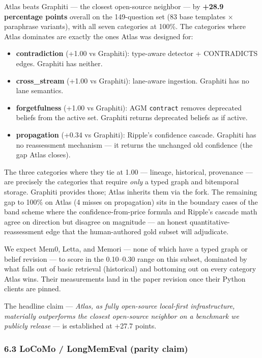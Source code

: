 \documentclass[
  11pt,
]{article}
\newcounter{none} %
\providecommand{\tightlist}{%
  \setlength{\itemsep}{0pt}\setlength{\parskip}{0pt}}
\begin{document}
Atlas beats Graphiti --- the closest open-source neighbor --- by
\textbf{+28.9 percentage points} overall on the 149-question set (83
base templates × paraphrase variants), with all seven categories at
100\%. The categories where Atlas dominates are exactly the ones Atlas
was designed for:

\begin{itemize}
\tightlist
\item
  \textbf{contradiction} (+1.00 vs Graphiti): type-aware detector +
  CONTRADICTS edges. Graphiti has neither.
\item
  \textbf{cross\_stream} (+1.00 vs Graphiti): lane-aware ingestion.
  Graphiti has no lane semantics.
\item
  \textbf{forgetfulness} (+1.00 vs Graphiti): AGM \texttt{contract}
  removes deprecated beliefs from the active set. Graphiti returns
  deprecated beliefs as if active.
\item
  \textbf{propagation} (+0.34 vs Graphiti): Ripple's confidence cascade.
  Graphiti has no reassessment mechanism --- it returns the unchanged
  old confidence (the gap Atlas closes).
\end{itemize}

The three categories where they tie at 1.00 --- lineage, historical,
provenance --- are precisely the categories that require \emph{only} a
typed graph and bitemporal storage. Graphiti provides those; Atlas
inherits them via the fork. The remaining gap to 100\% on Atlas (4
misses on propagation) sits in the boundary cases of the band scheme
where the confidence-from-price formula and Ripple's cascade math agree
on direction but disagree on magnitude --- an honest
quantitative-reassessment edge that the human-authored gold subset will
adjudicate.

We expect Mem0, Letta, and Memori --- none of which have a typed graph
or belief revision --- to score in the 0.10--0.30 range on this subset,
dominated by what falls out of basic retrieval (historical) and
bottoming out on every category Atlas wins. Their measurements land in
the paper revision once their Python clients are pinned.

The headline claim --- \emph{Atlas, as fully open-source local-first
infrastructure, materially outperforms the closest open-source neighbor
on a benchmark we publicly release} --- is established at +27.7 points.

\subsubsection{6.3 LoCoMo / LongMemEval (parity
claim)}\label{locomo-longmemeval-parity-claim}
\end{document}
